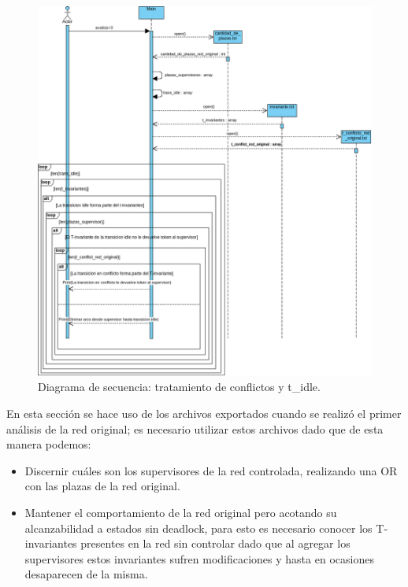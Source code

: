 \begin{figure}[H]
	\centering
	\includegraphics[width=\textwidth]{Figures/diagramasecuencia/Diagrama5.png}
	\caption{Diagrama de secuencia: tratamiento de conflictos y t\_idle.}
	\label{fig:diagrama-sec5}
\end{figure}

En esta sección se hace uso de los archivos exportados cuando se realizó el primer análisis de la red original; es necesario utilizar estos archivos dado que de esta manera podemos: 
\begin{itemize}
    \item Discernir cuáles son los supervisores de la red controlada, realizando una OR con las plazas de la red original.
    
    \item Mantener el comportamiento de la red original pero acotando su alcanzabilidad a estados sin deadlock, para esto es necesario conocer los T-invariantes presentes en la red sin controlar dado que al agregar los supervisores estos invariantes sufren modificaciones y hasta en ocasiones desaparecen de la misma.
\end{itemize}


